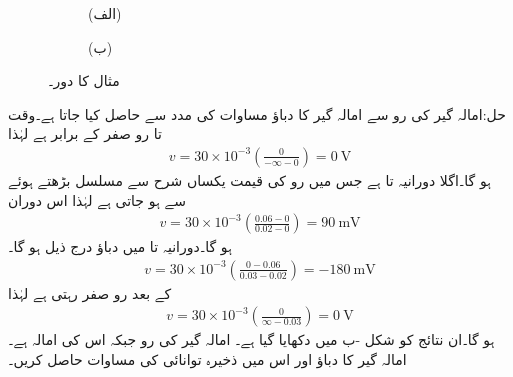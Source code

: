 \begin{figure}
\centering
\begin{subfigure}{0.5\textwidth}
\caption*{(الف)}
\end{subfigure}%
\begin{subfigure}{0.5\textwidth}
\caption*{(ب)}
\end{subfigure}%
\caption{مثال  کا دور۔}
\label{شکل_امالہ_یکسمتی_دور_ب}
\end{figure}

حل:امالہ گیر کی رو سے امالہ گیر کا دباؤ مساوات  کی مدد سے حاصل کیا جاتا ہے۔وقت  تا  رو صفر کے برابر ہے لہٰذا
\begin{align*}
v=30\times 10^{-3} \left(\frac{0}{-\infty-0}\right)=\SI{0}{\volt}
\end{align*}
ہو گا۔اگلا دورانیہ  تا  ہے جس میں رو کی قیمت  یکساں شرح سے مسلسل بڑھتے ہوئے  سے  ہو جاتی ہے لہٰذا اس دوران
\begin{align*}
v=30\times 10^{-3} \left(\frac{0.06-0}{0.02-0}\right)=\SI{90}{\milli\volt}
\end{align*}
ہو گا۔دورانیہ  تا  میں دباؤ درج ذیل ہو گا۔
\begin{align*}
v=30\times 10^{-3} \left(\frac{0-0.06}{0.03-0.02}\right)=\SI{-180}{\milli\volt}
\end{align*}
 کے بعد رو صفر رہتی ہے لہٰذا
\begin{align*}
v=30\times 10^{-3} \left(\frac{0}{\infty-0.03}\right)=\SI{0}{\volt}
\end{align*}
ہو گا۔ان نتائج کو شکل -ب میں دکھایا گیا ہے۔
امالہ گیر کی رو  جبکہ اس کی امالہ  ہے۔امالہ گیر کا دباؤ اور اس میں ذخیرہ توانائی کی مساوات حاصل کریں۔

